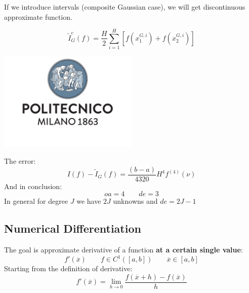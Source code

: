If we introduce intervals (composite Gaussian case), we will get discontinuous approximate function.

\begin{LARGE}
    $$
    \tilde{I}_G^c(f)=\frac{H}{2}
    \sum_{i=1}^H
    \left[
        f(x_1^{G,i})+
        f(x_2^{G,i})
    \right]
    $$
\end{LARGE}
\begin{center}
    \includegraphics[width=0.5\textwidth]{images/logo.pdf}
\end{center}
The error:
$$
I(f)-\tilde{I}_G(f)=\frac{(b-a)}{4320}H^4f^{(4)}(\nu)
$$
And in conclusion:
$$
oa=4\qquad de=3
$$
In general for degree $J$ we have $2J$ unknowns and $de=2J-1$

\subsection{Numerical Differentiation}
The goal is approximate derivative of a function \textbf{at a certain single value}:
$$
f'(\overline{x})\qquad f\in C^1\left([a,b]\right)\qquad\overline{x}\in [a,b]
$$
Starting from the definition of derivative:
$$
f'(\overline{x})=\lim_{h\rightarrow 0}
\frac{
    f(\overline{x}+h)-f(\overline{x})
}{h}
$$
